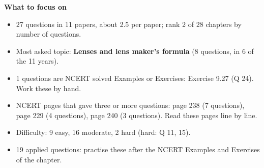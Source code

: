 \begin{minipage}[t]{0.63\linewidth}{\small\textbf{\color{crimson}What to focus on}\par\smallskip
\begin{itemize}[leftmargin=1.1em,itemsep=1pt,topsep=0pt]
\item 27 questions in 11 papers, about 2.5 per paper; rank 2 of 28 chapters by number of questions.
\item Most asked topic: \textbf{Lenses and lens maker's formula} (8 questions, in 6 of the 11 years).
\item 1 questions are NCERT solved Examples or Exercises: Exercise 9.27 (Q 24). Work these by hand.
\item NCERT pages that gave three or more questions: page 238 (7 questions), page 229 (4 questions), page 240 (3 questions). Read these pages line by line.
\item Difficulty: 9 easy, 16 moderate, 2 hard (hard: Q 11, 15).
\item 19 applied questions: practise these after the NCERT Examples and Exercises of the chapter.
\end{itemize}}\end{minipage}\par
{}
